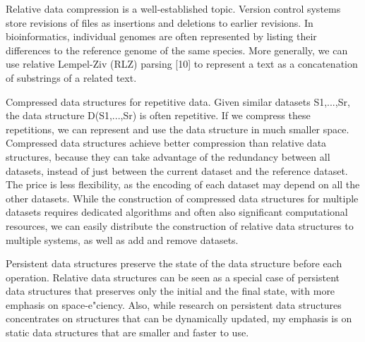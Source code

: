 Relative data compression is a well-established topic. Version control systems
store
revisions of files as insertions and deletions to earlier revisions. In
bioinformatics, individual
genomes are often represented by listing their differences to the reference
genome
of the same species. More generally, we can use relative Lempel-Ziv (RLZ)
parsing [10]
to represent a text as a concatenation of substrings of a related text.

Compressed data structures for repetitive data. Given similar datasets
S1,...,Sr, the
data structure D(S1,...,Sr) is often repetitive. If we compress these
repetitions, we can
represent and use the data structure in much smaller space. Compressed data
structures
achieve better compression than relative data structures, because they can
take advantage
of the redundancy between all datasets, instead of just between the current
dataset and
the reference dataset. The price is less flexibility, as the encoding of each
dataset may
depend on all the other datasets. While the construction of compressed data
structures for
multiple datasets requires dedicated algorithms and often also significant
computational
resources, we can easily distribute the construction of relative data
structures to multiple
systems, as well as add and remove datasets.

Persistent data structures preserve the state of the data structure before
each operation.
Relative data structures can be seen as a special case of persistent data
structures
that preserves only the initial and the final state, with more emphasis on
space-e"ciency.
Also, while research on persistent data structures concentrates on structures
that can be
dynamically updated, my emphasis is on static data structures that are smaller
and faster
to use.
\fi

